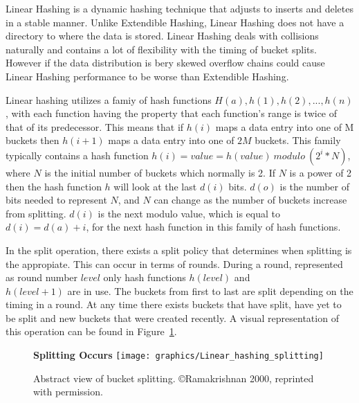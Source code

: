 \documentclass[letterpaper, 11pt]{article}
\begin{document}
Linear Hashing is a dynamic hashing technique that adjusts to inserts and deletes in a stable manner.
Unlike Extendible Hashing, Linear Hashing does not have a directory to where the data is
stored. Linear Hashing deals with collisions naturally and contains a lot of flexibility with
the timing of bucket splits. However if the data distribution is bery skewed overflow chains could cause Linear Hashing performance to be
worse than Extendible Hashing.
\par\vspace{\baselineskip}

Linear hashing utilizes a famiy of hash functions $H(a), h(1), h(2), ... , h(n)$, with each function 
having the property that each function's range is twice of that of its predecessor. This means that 
if $h(i)$ maps a data entry into one of M buckets then $h(i+1)$ maps a data entry into one of $2M$ 
buckets. This family typically contains a hash function $h(i) = value = h(value)\ modulo\ (2^i * N) $, 
where $N$ is the initial number of buckets which normally is 2. If $N$ is a power of 2 then the hash 
function $h$ will look at the last $d(i)$ bits. $d(o)$ is the number of bits needed to represent $N$, 
and $N$ can change as the number of buckets increase from splitting. $d(i)$ is the next modulo value, 
which is equal to $d(i) = d(a)+i$, for the next hash function in this family of hash functions.
\par\vspace{\baselineskip}

In the split operation, there exists a split policy that determines when splitting is the appropiate. 
This can occur in terms of rounds. During a round, represented as round number $level$ only hash 
functions $h(level)$ and \\ $h(level+1)$ are in use. The buckets from first to last are split depending 
on the timing in a round. At any time there exists buckets that have split, have yet to be split and new 
buckets that were created recently. A visual representation of this operation can be found in 
Figure~\ref{fig:lin_hash_split}.
\par\vspace{\baselineskip}

\begin{figure}[H]
  \centering
  \textbf{Splitting Occurs}
  \texttt{[image: graphics/Linear\_hashing\_splitting]}
  \caption{Abstract view of bucket splitting. \newline \copyright Ramakrishnan 2000, reprinted with permission.\cite{ramakrishnan2000database}}
  \label{fig:lin_hash_split}
\end{figure}
\end{document}
